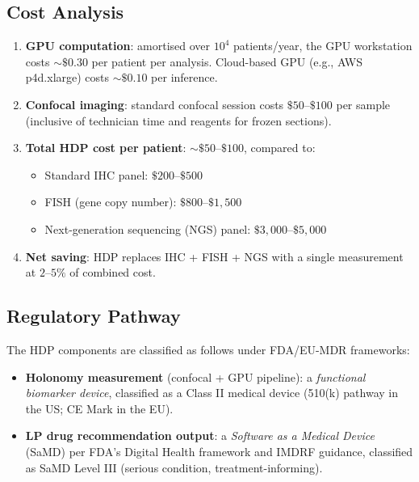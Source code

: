 \subsection{Cost Analysis}

\begin{enumerate}[label=(\roman*), itemsep=4pt]
    \item \textbf{GPU computation}: amortised over $10^4$ patients/year,
          the GPU workstation costs $\sim\$0.30$ per patient per analysis.
          Cloud-based GPU (e.g., AWS p4d.xlarge) costs $\sim\$0.10$ per
          inference.
    \item \textbf{Confocal imaging}: standard confocal session costs
          $\$50$--$\$100$ per sample (inclusive of technician time and
          reagents for frozen sections).
    \item \textbf{Total HDP cost per patient}: $\sim\$50$--$\$100$,
          compared to:
          \begin{itemize}[noitemsep]
              \item Standard IHC panel: $\$200$--$\$500$
              \item FISH (gene copy number): $\$800$--$\$1{,}500$
              \item Next-generation sequencing (NGS) panel: $\$3{,}000$--$\$5{,}000$
          \end{itemize}
    \item \textbf{Net saving}: HDP replaces IHC + FISH + NGS with a single
          measurement at $2$--$5\%$ of combined cost.
\end{enumerate}

\subsection{Regulatory Pathway}

\begin{definition}
\label{def:ch04-regulatory}
The HDP components are classified as follows under FDA/EU-MDR frameworks:
\begin{itemize}[noitemsep]
    \item \textbf{Holonomy measurement} (confocal + GPU pipeline): a
          \emph{functional biomarker device}, classified as a Class II
          medical device (510(k) pathway in the US; CE Mark in the EU).
    \item \textbf{LP drug recommendation output}: a \emph{Software as a
          Medical Device} (SaMD) per FDA's Digital Health framework and
          IMDRF guidance, classified as SaMD Level III (serious condition,
          treatment-informing).
\end{itemize}
\end{definition}

